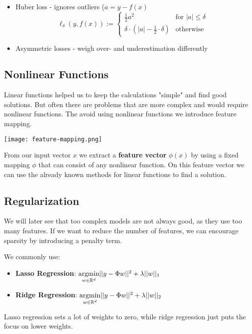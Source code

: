 \begin{itemize}
	\item Huber loss - ignores outliers ($a = y - f(x)$
		$$\ell_\delta(y, f(x)) := \begin{cases}
			\frac{1}{2} a^2 & \text{for } |a| \leq \delta \\
			\delta \cdot (|a| - \frac{1}{2} \cdot \delta) & \text{otherwise}
		\end{cases}$$
	\item Asymmetric losses - weigh over- and underestimation differently
\end{itemize}

\subsection{Nonlinear Functions}

Linear functions helped us to keep the calculations "simple" and find good solutions. But often there are problems that are more complex and would require nonlinear functions. The avoid using nonlinear functions we introduce feature mapping. 

\texttt{[image: feature-mapping.png]}

From our input vector $x$ we extract a \textbf{feature vector} $\phi(x)$ by using a fixed mapping $\phi$ that can consist of any nonlinear function. On this feature vector we can use the already known methods for linear functions to find a solution.

\subsection{Regularization}

We will later see that too complex models are not always good, as they use too many features. If we want to reduce the number of features, we can encourage sparsity by introducing a penalty term. 

We commonly use:
\begin{itemize}
	\item \textbf{Lasso Regression}: $\underset{w \in \mathbb{R}^d}{\text{argmin}} ||y - \Phi w||^2 + \lambda ||w||_1$
	\item \textbf{Ridge Regression}: $\underset{w \in \mathbb{R}^d}{\text{argmin}} ||y - \Phi w||^2 + \lambda ||w||_2$
\end{itemize}

Lasso regression sets a lot of weights to zero, while ridge regression just puts the focus on lower weights.